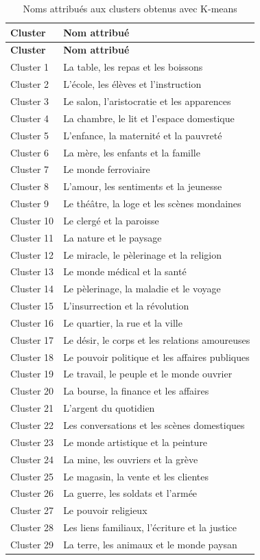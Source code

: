 \begin{longtable}{p{2cm}p{11cm}}
\caption{Noms attribués aux clusters obtenus avec K-means} \\
\toprule
\textbf{Cluster} & \textbf{Nom attribué} \\
\midrule
\endfirsthead

\toprule
\textbf{Cluster} & \textbf{Nom attribué} \\
\midrule
\endhead

Cluster 1 & La table, les repas et les boissons \\
Cluster 2 & L'école, les élèves et l'instruction \\
Cluster 3 & Le salon, l'aristocratie et les apparences \\
Cluster 4 & La chambre, le lit et l'espace domestique \\
Cluster 5 & L'enfance, la maternité et la pauvreté \\
Cluster 6 & La mère, les enfants et la famille \\
Cluster 7 & Le monde ferroviaire \\
Cluster 8 & L'amour, les sentiments et la jeunesse \\
Cluster 9 & Le théâtre, la loge et les scènes mondaines \\
Cluster 10 & Le clergé et la paroisse \\
Cluster 11 & La nature et le paysage \\
Cluster 12 & Le miracle, le pèlerinage et la religion \\
Cluster 13 & Le monde médical et la santé \\
Cluster 14 & Le pèlerinage, la maladie et le voyage \\
Cluster 15 & L'insurrection et la révolution \\
Cluster 16 & Le quartier, la rue et la ville \\
Cluster 17 & Le désir, le corps et les relations amoureuses \\
Cluster 18 & Le pouvoir politique et les affaires publiques \\
Cluster 19 & Le travail, le peuple et le monde ouvrier \\
Cluster 20 & La bourse, la finance et les affaires \\
Cluster 21 & L'argent du quotidien \\
Cluster 22 & Les conversations et les scènes domestiques \\
Cluster 23 & Le monde artistique et la peinture \\
Cluster 24 & La mine, les ouvriers et la grève \\
Cluster 25 & Le magasin, la vente et les clientes \\
Cluster 26 & La guerre, les soldats et l'armée \\
Cluster 27 & Le pouvoir religieux \\
Cluster 28 & Les liens familiaux, l'écriture et la justice \\
Cluster 29 & La terre, les animaux et le monde paysan \\
\bottomrule
\end{longtable}

